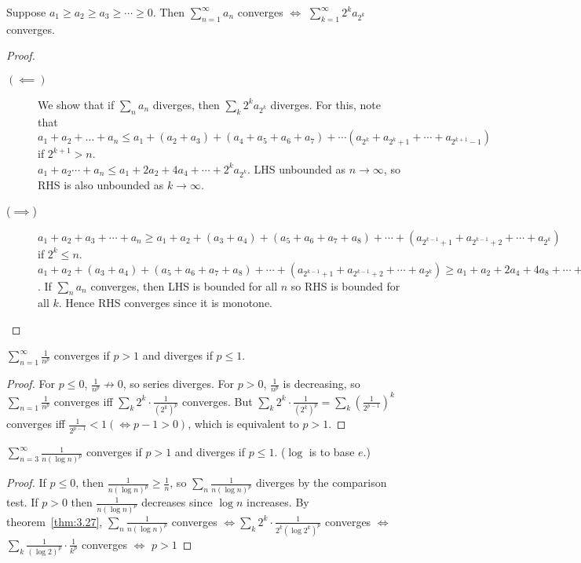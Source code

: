 \begin{theorem}
	\label{thm:3.27}
	Suppose $a_1\ge a_2\ge a_3\ge \cdots \ge 0$. Then $\sum_{n=1}^{\infty}{a_{n}}$ converges $\Leftrightarrow $ $\sum_{k=1}^{\infty}{2^{k}a_{2^{k}}}$ converges.
	\begin{proof}
		\begin{description}
			\item[$(\impliedby )$] We show that if $\sum_{n}{a_{n}}$ diverges, then $\sum_{k}{2^{k}a_{2^{k}}}$ diverges.
			      For this, note that $a_1+a_2+\ldots +a_{n}\le a_1+(a_2+a_3)+(a_4+a_5+a_6+a_7)+\cdots (a_{2^{k}}+a_{2^{k}+1}+\cdots + a_{2^{k+1}-1})$ if $2^{k+1}>n$.\\
			      $a_1+a_2 \cdots + a_{n} \le a_1+ 2 a_2 + 4 a_4 + \cdots + 2^{k}a_{2^{k}}$.
			      LHS unbounded as $n\to \infty $, so RHS is also unbounded as $k \to \infty $.

			\item[($\implies$)]
			      $a_1+a_2+a_3+\cdots+a_{n}\ge a_1+a_2+(a_3+a_4)+(a_5+a_6+a_7+a_8)+\cdots +(a_{2^{k-1}+1}+a_{2^{k-1}+2}+ \cdots + a_{2^{k}})$ if $2^{k}\le n$.
			      $a_1+a_2+(a_3+a_4)+(a_5+a_6+a_7+a_8)+\cdots +(a_{2^{k-1}+1}+a_{2^{k-1}+2}+ \cdots + a_{2^{k}})\ge a_1+a_2 + 2a_4 + 4a_8 +\cdots + 2^{k-1}a_{2^{k}}\ge
				      \frac{1}{2}(a_1+2a_2+4a_4+ \cdots +2^{k}a_{2^{k}})
			      $.
			      If $\sum_{n}{a_{n}}$ converges, then LHS is bounded for all $n$ so RHS is bounded for all $k$. Hence RHS converges since it is monotone.
		\end{description}
	\end{proof}
\end{theorem}

\begin{theorem}[$p$-series]
	\label{thm:3.28}
	$\sum_{n=1}^{\infty }{\frac{1}{n^{p}}}$ converges if $p>1$ and diverges if $p\le 1$.
	\begin{proof}
		For $p\le 0$, $\frac{1}{n^{p}} \not \to 0$, so series diverges.
		For $p>0$, $\frac{1}{n^{p}}$ is decreasing, so $\sum_{n=1}{\frac{1}{n^{p}}}$ converges iff $\sum_{k}{2^{k} \cdot \frac{1}{(2^{k})^{p}}}$ converges.
		But $\sum_{k}{2^{k}\cdot \frac{1}{(2^{k})^{p}}}=\sum_{k}{(\frac{1}{2^{p-1}})^{k}}$ converges iff $\frac{1}{2^{p-1}}<1(\Leftrightarrow p-1>0)$, which is equivalent to $p>1$.
	\end{proof}
\end{theorem}
\begin{theorem}
	\label{thm:3.29}
	$\sum_{n=3}^{\infty }{\frac{1}{n(\log{n})^{p}}}$ converges if $p>1$ and diverges if $p\le 1$. ($\log$ is to base $e$.)
	\begin{proof}
		If $p\le 0$, then $\frac{1}{n (\log{n})^{p}}\ge \frac{1}{n}$, so $\sum_{n}{\frac{1}{n(\log{n})^{p}}}$ diverges by the comparison test.
		If $p>0$ then $\frac{1}{n(\log{n})^{p}}$ decreases since $\log{n}$ increases. By theorem~\ref{thm:3.27}, $\sum_{n}{\frac{1}{n(\log{n})^{p}}}$ converges $\Leftrightarrow \sum_{k}{2^{k} \cdot \frac{1}{2^{k}(\log{2^{k}})^{p}}}$ converges  $\Leftrightarrow $  $\sum_{k}{\frac{1}{(\log{2})^{p}} \cdot \frac{1}{k^p}}$ converges $\Leftrightarrow $ $p>1$
	\end{proof}
\end{theorem}

